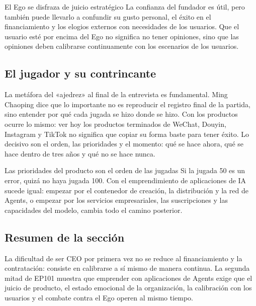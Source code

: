 \begin{warningbox}{El Ego se disfraza de juicio estratégico}
La confianza del fundador es útil, pero también puede llevarlo a confundir su gusto personal, el éxito en el financiamiento y los elogios externos con necesidades de los usuarios. Que el usuario esté por encima del Ego no significa no tener opiniones, sino que las opiniones deben calibrarse continuamente con los escenarios de los usuarios.
\end{warningbox}

\subsection{El jugador y su contrincante}

La metáfora del «ajedrez» al final de la entrevista es fundamental. Ming Chaoping dice que lo importante no es reproducir el registro final de la partida, sino entender por qué cada jugada se hizo donde se hizo. Con los productos ocurre lo mismo: ver hoy los productos terminados de WeChat, Douyin, Instagram y TikTok no significa que copiar su forma baste para tener éxito. Lo decisivo son el orden, las prioridades y el momento: qué se hace ahora, qué se hace dentro de tres años y qué no se hace nunca.

\begin{importantbox}{Las prioridades del producto son el orden de las jugadas}
Si la jugada 50 es un error, quizá no haya jugada 100. Con el emprendimiento de aplicaciones de IA sucede igual: empezar por el contenedor de creación, la distribución y la red de Agents, o empezar por los servicios empresariales, las suscripciones y las capacidades del modelo, cambia todo el camino posterior.
\end{importantbox}

\subsection{Resumen de la sección}

La dificultad de ser CEO por primera vez no se reduce al financiamiento y la contratación: consiste en calibrarse a sí mismo de manera continua. La segunda mitad de EP101 muestra que emprender con aplicaciones de Agents exige que el juicio de producto, el estado emocional de la organización, la calibración con los usuarios y el combate contra el Ego operen al mismo tiempo.
